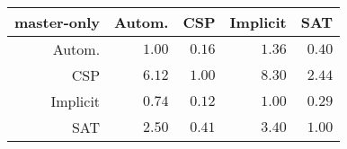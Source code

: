 \begin{tabular}{r|rrrr}
 master-only &             Autom. &                CSP &           Implicit &                SAT\\\hline
      Autom. & $            1.00$ & $            0.16$ & $            1.36$ & $            0.40$\\
         CSP & $            6.12$ & $            1.00$ & $            8.30$ & $            2.44$\\
    Implicit & $            0.74$ & $            0.12$ & $            1.00$ & $            0.29$\\
         SAT & $            2.50$ & $            0.41$ & $            3.40$ & $            1.00$\\
\end{tabular}
